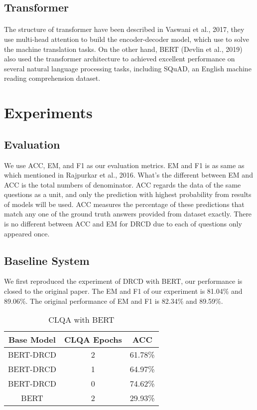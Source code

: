 \documentclass[12pt]{article}
\begin{document}
\subsection{Transformer}
\paragraph{}
The structure of transformer have been described in Vaswani et al., 2017, they use multi-head attention to build the encoder-decoder model, which use to solve the machine translation tasks. On the other hand, BERT (Devlin et al., 2019) also used the transformer architecture to achieved excellent performance on several natural language processing tasks, including SQuAD, an English machine reading comprehension dataset.

\section{Experiments}
\subsection{Evaluation}
We use ACC, EM, and F1 as our evaluation metrics. EM and F1 is as same as which mentioned in Rajpurkar et al., 2016. What's the different between EM and ACC is the total numbers of denominator. ACC regards the data of the same questions as a unit, and only the prediction with highest probability from results of models will be used. ACC measures the percentage of these predictions that match any one of the ground truth answers provided from dataset exactly. There is no different between ACC and EM for DRCD due to each of questions only appeared once.

\subsection{Baseline System}
We first reproduced the experiment of DRCD with BERT, our performance is closed to the original paper. The EM and F1 of our experiment is 81.04\% and 89.06\%. The original performance of EM and F1 is 82.34\% and 89.59\%.

\begin{table}[h!]
  \centering
  \caption{CLQA with BERT}
  \begin{tabular}{ccc}
    Base Model & CLQA Epochs & ACC \\
    \toprule
    BERT-DRCD & 2 & 61.78\% \\
    BERT-DRCD & 1 & 64.97\% \\
    BERT-DRCD & 0 & 74.62\% \\
    BERT & 2 & 29.93\% \\
  \end{tabular}
  \label{tab:bert-clqa}
\end{table}
\end{document}
